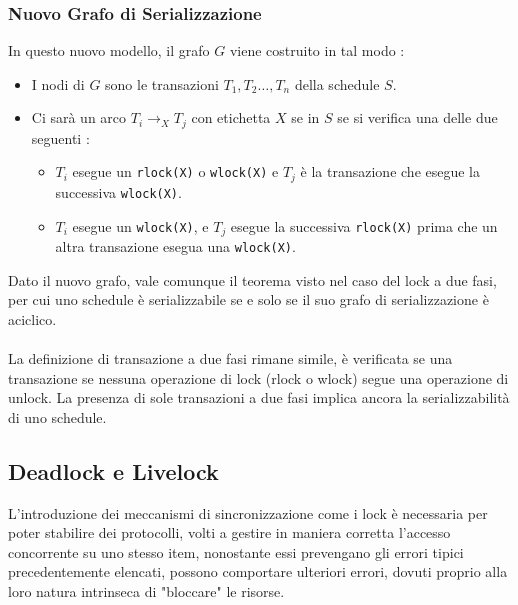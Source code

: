 \documentclass[12pt, letterpaper]{article}
\newcommand{\code}[1]{\colorbox{light-gray}{\texttt{#1}}}
\newcommand{\acc}{\\\hphantom{}\\}
\begin{document}
\subsubsection{Nuovo Grafo di Serializzazione}
In questo nuovo modello, il grafo \(G\) viene costruito in tal modo : \begin{itemize}
    \item I nodi di \(G\) sono le transazioni \(T_1,T_2\dots,T_n\) della schedule \(S\).
    \item Ci sarà un arco \(T_i\rightarrow_X T_j\) con etichetta \(X\) se in \(S\) se si verifica una delle due seguenti : \begin{itemize}
        \item \(T_i\) esegue un \code{rlock(X)} o \code{wlock(X)} e \(T_j\) è la transazione che esegue 
        la successiva \code{wlock(X)}.
        \item \(T_i\) esegue un \code{wlock(X)}, e \(T_j\) esegue la successiva \code{rlock(X)} prima che un altra transazione 
        esegua una \code{wlock(X)}.
    \end{itemize}
\end{itemize}
Dato il nuovo grafo, vale comunque il teorema visto nel caso del lock a due fasi, per cui uno schedule è serializzabile se e solo se il suo grafo di serializzazione è 
aciclico. 
\acc
La definizione di transazione a due fasi rimane simile, è verificata se una transazione se
nessuna operazione di lock (rlock o wlock) segue una operazione di unlock. La presenza di sole  transazioni 
a due fasi implica ancora la serializzabilità di uno schedule.
\begin{figure}[h]
\end{figure}
\subsection{Deadlock e Livelock}
L'introduzione dei meccanismi di sincronizzazione come i lock è necessaria per poter stabilire dei protocolli, volti 
a gestire in maniera corretta l'accesso concorrente su uno stesso item, nonostante essi prevengano gli errori tipici 
precedentemente elencati, possono comportare ulteriori errori, dovuti proprio alla loro
 natura intrinseca di "bloccare" le risorse. 
\end{document}
